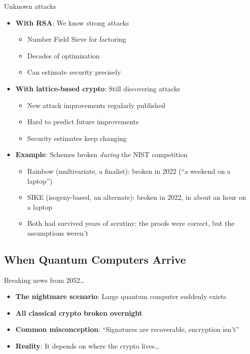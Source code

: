 \ifdefined\PRESENTATION\else\PassOptionsToClass{handout}{beamer}\fi\documentclass[aspectratio=169, lualatex]{beamer}
\begin{document}
\begin{frame}{Unknown attacks}
	\begin{itemize}
		\item \textbf{With RSA}: We know strong attacks
		      \begin{itemize}
			      \item Number Field Sieve for factoring
			      \item Decades of optimization
			      \item Can estimate security precisely
		      \end{itemize}
		\item \textbf{With lattice-based crypto}: Still discovering attacks
		      \begin{itemize}
			      \item New attack improvements regularly published
			      \item Hard to predict future improvements
			      \item Security estimates keep changing
		      \end{itemize}
		\item \textbf{Example}: Schemes broken \textit{during} the NIST competition
		      \begin{itemize}
			      \item Rainbow (multivariate, a finalist): broken in 2022 (``a weekend on a laptop'')
			      \item SIKE (isogeny-based, an alternate): broken in 2022, in about an hour on a laptop
			      \item Both had survived years of scrutiny; the proofs were correct, but the assumptions weren't
		      \end{itemize}
	\end{itemize}
\end{frame}

\subsection{When Quantum Computers Arrive}
\begin{frame}{Breaking news from 2052\ldots}
	\begin{itemize}
		\item \textbf{The nightmare scenario}: Large quantum computer suddenly exists
		\item \textbf{All classical crypto broken overnight}
		\item \textbf{Common misconception}: ``Signatures are recoverable, encryption isn't''
		\item \textbf{Reality}: It depends on where the crypto lives\ldots
	\end{itemize}
\end{frame}
\end{document}
